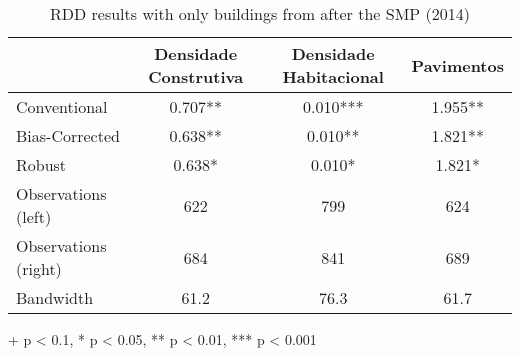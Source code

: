 \begin{table}[h]
\centering
\caption{RDD results with only buildings from after the SMP (2014)} 
\fontsize{10pt}{12pt}\selectfont
\begin{tabular*}{.85\linewidth}{@{\extracolsep{\fill}}lccc}
\toprule
  & Densidade Construtiva & Densidade Habitacional & Pavimentos \\ 
\midrule\addlinespace[2.5pt]
Conventional & 0.707** & 0.010*** & 1.955** \\ 
Bias-Corrected & 0.638** & 0.010** & 1.821** \\ 
{Robust} & {0.638*} & {0.010*} & {1.821*} \\ 
\midrule
Observations (left)  & 622 & 799 & 624 \\ 
Observations (right) & 684 & 841 & 689 \\ 
Bandwidth & 61.2 & 76.3 & 61.7 \\ 
\bottomrule
\end{tabular*}
\begin{minipage}{.85\linewidth}
+ p < 0.1, * p < 0.05, ** p < 0.01, *** p < 0.001\\
\end{minipage}
\label{tab:rdd-IPTU}
\end{table}

